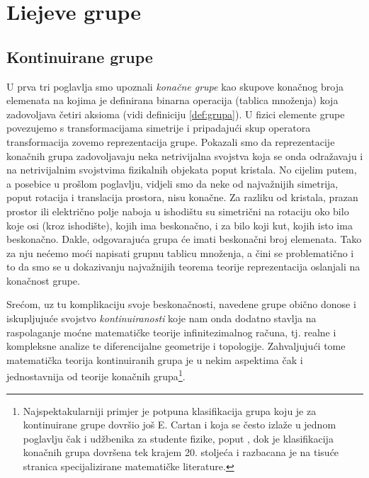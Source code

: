 
\chapter{Liejeve grupe}
\label{ch:lie}

\section{Kontinuirane grupe}


U prva tri poglavlja smo upoznali \emph{konačne grupe} kao skupove
konačnog broja elemenata na kojima je definirana binarna operacija (tablica množenja)
koja zadovoljava četiri aksioma (vidi definiciju \ref{def:grupa}). 
U fizici elemente grupe povezujemo
s transformacijama simetrije i pripadajući skup operatora transformacija
zovemo reprezentacija grupe. Pokazali smo da reprezentacije konačnih grupa
zadovoljavaju neka netrivijalna svojstva koja se onda odražavaju
i na netrivijalnim svojstvima fizikalnih objekata poput kristala.
No cijelim putem, a posebice u prošlom poglavlju, vidjeli smo da neke
od najvažnijih simetrija, poput rotacija i translacija prostora,
nisu konačne. Za razliku od kristala, prazan prostor ili električno
polje naboja u ishodištu su simetrični na rotaciju oko bilo koje
osi (kroz ishodište), kojih ima beskonačno, i za bilo koji kut, kojih
isto ima beskonačno. Dakle, odgovarajuća grupa će imati beskonačni
broj elemenata. Tako za nju nećemo moći napisati grupnu tablicu
množenja, a čini se problematično i to da smo se u dokazivanju
najvažnijih teorema teorije reprezentacija oslanjali na konačnost
grupe.

Srećom, uz tu komplikaciju svoje beskonačnosti, navedene grupe obično donose
i iskupljujuće svojstvo \emph{kontinuiranosti} koje nam onda dodatno
stavlja na raspolaganje moćne matematičke teorije infinitezimalnog računa,
tj. realne i kompleksne analize te diferencijalne geometrije i topologije.
Zahvaljujući tome matematička teorija kontinuiranih grupa je u nekim aspektima
čak i jednostavnija od teorije konačnih grupa\footnote{Najspektakularniji
    primjer je potpuna klasifikacija grupa koju je za kontinuirane
    grupe dovršio još E. Cartan i koja se često izlaže u jednom poglavlju
    čak i udžbenika za studente fizike, poput \cite{Jones:1998}, dok je
    klasifikacija konačnih grupa dovršena tek krajem 20. stoljeća i razbacana
je na tisuće stranica specijalizirane matematičke literature.}.


